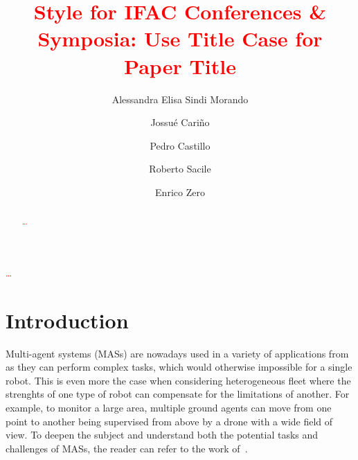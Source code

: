 \documentclass{ifacconf}
\begin{document}
\begin{frontmatter}

\title{\textcolor{red}{Style for IFAC Conferences \& Symposia: Use Title Case for
  Paper Title}} 

\author[First,Second]{Alessandra Elisa Sindi Morando} 
\author[Second]{Jossué Cari\~no}
\author[Second]{Pedro Castillo} 
\author[First]{Roberto Sacile}
\author[First]{Enrico Zero}

\address[First]{
   \textit{University of Genoa}, Genoa, Italy \\
   alessandra.elisa.sindi.morando@edu.unige.it, roberto.sacile@unige.it, enrico.zero@dibris.unige.it
}
\address[Second]{
   \textit{Université de technologie de Compiègne}, CNRS, Heudiasyc, Compiègne, France \\
   alessandra-elisa-sindi.morando@utc.fr, \{jossue.escobar, pedro.castillo\}@hds.utc.fr
}

\begin{abstract}                %
\textcolor{red}{\dots}
\end{abstract}

\begin{keyword}
   \textcolor{red}{\dots}
\end{keyword}

\end{frontmatter}

\section{Introduction}
Multi-agent systems (MASs) are nowadays used in a variety of applications from as
they can perform complex tasks, which would otherwise impossible for a single robot.
This is even more the case when considering heterogeneous fleet where the strenghts
of one type of robot can compensate for the limitations of another.
For example, to monitor a large area, multiple ground agents can move from one point 
to another being supervised from above by a drone with a wide field of view.
To deepen the subject and understand both the potential tasks and challenges of MASs,
the reader can refer to the work of~\cite{Maldonado2024}.
\end{document}
